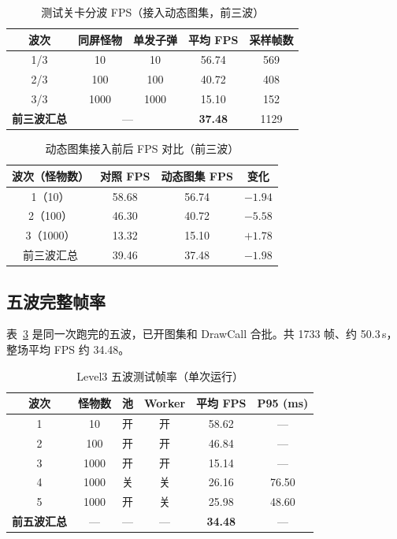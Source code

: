 \begin{table}[htbp]
  \centering
  \caption{测试关卡分波 FPS（接入动态图集，前三波）}
  \label{tab:test-level-fps-atlas}
  \begin{tabular}{ccccc}
    \toprule
    \textbf{波次} & \textbf{同屏怪物} & \textbf{单发子弹} & \textbf{平均 FPS} & \textbf{采样帧数} \\
    \midrule
    1/3 & 10 & 10 & 56.74 & 569 \\
    2/3 & 100 & 100 & 40.72 & 408 \\
    3/3 & 1000 & 1000 & 15.10 & 152 \\
    \midrule
    \textbf{前三波汇总} & \multicolumn{2}{c}{—} & \textbf{37.48} & 1129 \\
    \bottomrule
  \end{tabular}
\end{table}

\begin{table}[htbp]
  \centering
  \caption{动态图集接入前后 FPS 对比（前三波）}
  \label{tab:test-level-fps-compare}
  \begin{tabular}{cccc}
    \toprule
    \textbf{波次（怪物数）} & \textbf{对照 FPS} & \textbf{动态图集 FPS} & \textbf{变化} \\
    \midrule
    1（10） & 58.68 & 56.74 & $-1.94$ \\
    2（100） & 46.30 & 40.72 & $-5.58$ \\
    3（1000） & 13.32 & 15.10 & $+1.78$ \\
    \midrule
    前三波汇总 & 39.46 & 37.48 & $-1.98$ \\
    \bottomrule
  \end{tabular}
\end{table}

\subsection{五波完整帧率}

表~\ref{tab:test-five-waves} 是同一次跑完的五波，已开图集和 DrawCall 合批。共 1733 帧、约 50.3\,s，整场平均 FPS 约 34.48。

\begin{table}[htbp]
  \centering
  \caption{Level3 五波测试帧率（单次运行）}
  \label{tab:test-five-waves}
  \begin{tabular}{cccccc}
    \toprule
    \textbf{波次} & \textbf{怪物数} & \textbf{池} & \textbf{Worker} & \textbf{平均 FPS} & \textbf{P95 (ms)} \\
    \midrule
    1 & 10 & 开 & 开 & 58.62 & — \\
    2 & 100 & 开 & 开 & 46.84 & — \\
    3 & 1000 & 开 & 开 & 15.14 & — \\
    4 & 1000 & 关 & 关 & 26.16 & 76.50 \\
    5 & 1000 & 开 & 关 & 25.98 & 48.60 \\
    \midrule
    \textbf{前五波汇总} & — & — & — & \textbf{34.48} & — \\
    \bottomrule
  \end{tabular}
\end{table}

